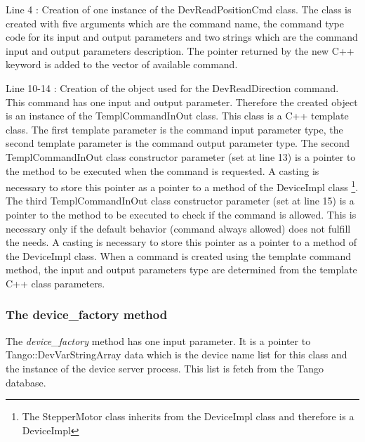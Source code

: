 Line 4 : Creation of one instance of the DevReadPositionCmd class.
The class is created with five arguments which are the command name,
the command type code for its input and output parameters and two
strings which are the command input and output parameters description.
The pointer returned by the new C++ keyword is added to the vector
of available command.

Line 10-14 : Creation of the object used for the DevReadDirection
command. This command has one input and output parameter. Therefore
the created object is an instance of the TemplCommandInOut class.
This class is a C++ template class. The first template parameter is
the command input parameter type, the second template parameter is
the command output parameter type. The second TemplCommandInOut
class constructor parameter (set at line 13) is a pointer to the method
to be executed when the command is requested. A casting is necessary
to store this pointer as a pointer to a method of the DeviceImpl class%
\footnote{The StepperMotor class inherits from the DeviceImpl class and therefore
is a DeviceImpl%
}. The third TemplCommandInOut class constructor parameter (set at
line 15) is a pointer to the method to be executed to check if the
command is allowed. This is necessary only if the default behavior
(command always allowed) does not fulfill the needs. A casting is
necessary to store this pointer as a pointer to a method of the DeviceImpl
class. When a command is created using the template command method,
the input and output parameters type are determined from the template
C++ class parameters.


\subsubsection{The device\_factory method}

The \emph{device\_factory} method has one input
parameter. It is a pointer to Tango::DevVarStringArray data which
is the device name list for this class and the instance of the device
server process. This list is fetch from the Tango database.

